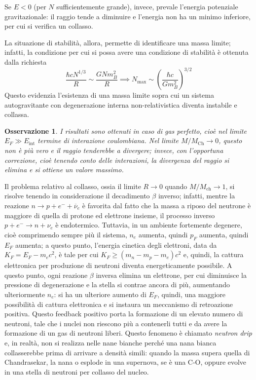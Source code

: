 \documentclass[11pt, a4paper]{scrartcl}
\theoremstyle{style}
\newtheorem{osservazione}{Osservazione}[section]
\theoremstyle{style1}
\numberwithin{equation}{subsection}
\begin{document}
Se $E < 0$ (per $N$ sufficientemente grande), invece, prevale l'energia potenziale gravitazionale: il raggio tende a diminuire e l'energia non ha un minimo inferiore, per cui si verifica un collasso.

La situazione di stabilit\`a, allora, permette di identificare una massa limite; infatti, la condizione per cui si possa avere una condizione di stabilit\`a \`e ottenuta dalla richiesta
\[
\frac{\hbar  c N^{1 / 3}}{R} \sim \frac{GN m_B^2}{R}\implies N_\text{max} \sim \left(\frac{\hbar c}{Gm_B^2}\right) ^{3 / 2}
\] 
Questo evidenzia l'esistenza di una massa limite sopra cui un sistema autogravitante con degenerazione interna non-relativistica diventa instabile e collassa.
\begin{osservazione}
I risultati sono ottenuti in caso di gas perfetto, cio\`e nel limite $E_F \gg E_\text{int}$ termine di interazione coulombiana. 
Nel limite $M / M_\text{Ch}\to 0$, questo non \`e pi\`u vero e il raggio tenderebbe a divergere; invece, con l'opportuna correzione, cio\`e tenendo conto delle interazioni, la divergenza del raggio si elimina e si ottiene un valore massimo.
\end{osservazione}
\noindent Il problema relativo al collasso, ossia il limite $R\to 0$ quando $M / M_\text{ch}\to 1$, si risolve tenendo in considerazione il decadimento $\beta $ inverso; infatti, mentre la reazione $n \to p + e^- + \overline{\nu }_e$ \`e favorita dal fatto che la massa a riposo del neutrone \`e maggiore di quella di protone ed elettrone insieme, il processo inverso $p + e^- \to n + \nu _e$ \`e endotermico.
Tuttavia, in un ambiente fortemente degenere, cio\`e comprimendo sempre pi\`u il sistema, $n_e$ aumenta, quindi $p_F$ aumenta, quindi $E_F$ aumenta; a questo punto, l'energia cinetica degli elettroni, data da $K_F = E_F - m_e c^2$, \`e tale per cui $K_F \ge (m_n - m_p - m_e)c^2$ e, quindi, la cattura elettronica per produzione di neutroni diventa energeticamente possibile.
A questo punto, ogni reazione $\beta $ inversa elimina un elettrone, per cui diminuisce la pressione di degenerazione e la stella si contrae ancora di pi\`u, aumentando ulteriormente $n_e$: si ha un ulteriore aumento di $E_F$, quindi, una maggiore possibilit\`a di cattura elettronica e si instaura un meccanismo di retroazione positiva.
Questo feedback positivo porta la formazione di un elevato numero di neutroni, tale che i nuclei non riescono pi\`u a contenerli tutti e da avere la formazione di un gas di neutroni liberi.
Questo fenomeno \`e chiamato \textit{neutron drip} e, in realt\`a, non si realizza nelle nane bianche perch\'e una nana bianca collasserebbe prima di arrivare a densit\`a simili: quando la massa supera quella di Chandrasekar, la nana o esplode in una supernova, se \`e una C-O, oppure evolve in una stella di neutroni per collasso del nucleo.
\end{document}
